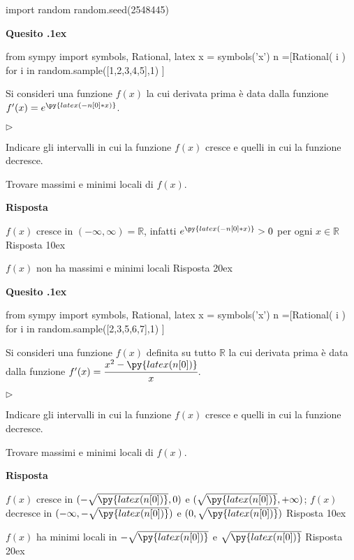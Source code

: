 \documentclass[11pt,twoside,a4paper]{article}
\newcommand{\mylabel}[1]{#1\hfill}
\renewenvironment{itemize}
  {\begin{list}{$\triangleright$}{%
   \setlength{\parskip}{0mm}
   \setlength{\topsep}{.4\baselineskip}
   \setlength{\rightmargin}{0mm}
   \setlength{\listparindent}{0mm}
   \setlength{\itemindent}{0mm}
   \setlength{\labelwidth}{2ex}
   \setlength{\itemsep}{.4\baselineskip}
   \setlength{\parsep}{0mm}
   \setlength{\partopsep}{0mm}
   \setlength{\labelsep}{1ex}
   \setlength{\leftmargin}{\labelwidth+\labelsep}
   \let\makelabel\mylabel}}{%
   \end{list}\vspace*{-1.3mm}}
\newcounter{quesito}
\newenvironment{question}{\bigskip\addtocounter{quesito}{1}\bigskip\bigskip\par\textbf{Quesito \thequesito.\kern1ex}}{\vspace{\parskip}}
\newenvironment{answer}{\par\textbf{Risposta\quad}}{\vspace{\parskip}}
\begin{document}
\begin{pycode}
import random
random.seed(2548445)
\end{pycode}
\begin{question}
\def\RR{{\mathds R}}
\begin{pycode}
from sympy import symbols, Rational, latex
x = symbols('x')
n =[Rational( i ) for i in random.sample([1,2,3,4,5],1) ]
\end{pycode}
Si consideri una funzione $f(x)$ la cui derivata prima è data dalla funzione $f'(x) = e^{\py{latex(-n[0]*x)}}$.
\begin{itemize}
\item[1.] Indicare gli intervalli in cui la funzione $f(x)$ cresce e quelli in cui la funzione decresce.
\item[2.] Trovare massimi e minimi locali di $f(x)$.
\end{itemize}
\begin{answer}

{\color{blue}
$f(x)$ cresce in $(-\infty, \infty) = \RR$}, infatti $e^{\py{latex(-n[0]*x)}} > 0$ per ogni $x \in \RR$
{\color{blue}
\hfill Risposta 1\kern0ex}

{\color{blue}
$f(x)$ non ha massimi e minimi locali
\hfill Risposta 2\kern0ex}

\end{answer}
\end{question}
\begin{question}
\def\RR{{\mathds R}}
\begin{pycode}
from sympy import symbols, Rational, latex
x = symbols('x')
n =[Rational( i ) for i in random.sample([2,3,5,6,7],1) ]
\end{pycode}
Si consideri una funzione $f(x)$ definita su tutto $\RR$ la cui derivata prima è data dalla funzione $f'(x) = \cfrac{x^2 - \py{latex(n[0])}}{x}$.
\begin{itemize}
\item[1.] Indicare gli intervalli in cui la funzione $f(x)$ cresce e quelli in cui la funzione decresce.
\item[2.] Trovare massimi e minimi locali di $f(x)$.
\end{itemize}
\begin{answer}

{\color{blue}
$f(x)$ cresce in $(-\sqrt{\py{latex(n[0])}}, 0)$ e $(\sqrt{\py{latex(n[0])}}, +\infty)$; $f(x)$ decresce in $(-\infty, -\sqrt{\py{latex(n[0])}})$ e $(0, \sqrt{\py{latex(n[0])}})$
\hfill Risposta 1\kern0ex}

{\color{blue}
$f(x)$ ha minimi locali in $-\sqrt{\py{latex(n[0])}}$ e $\sqrt{\py{latex(n[0])}}$
\hfill Risposta 2\kern0ex}

\end{answer}
\end{question}
\end{document}
